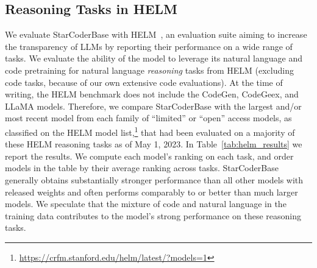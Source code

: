 \documentclass[10pt]{article} %
\begin{document}


\subsection{Reasoning Tasks in HELM}
% 


We evaluate StarCoderBase with HELM~\citep{liang2022helm}, an evaluation suite aiming to increase the transparency of LLMs by reporting their performance on a wide range of tasks. 
We evaluate the ability of the model to leverage its natural language and code pretraining for natural language \emph{reasoning} tasks from HELM (excluding code tasks, because of our own extensive code evaluations).
At the time of writing, the HELM benchmark does not include the CodeGen, CodeGeex, and LLaMA models. Therefore, we compare StarCoderBase with the largest and/or most recent model from each family of ``limited'' or ``open'' access models, as classified on the HELM model list,\footnote{\url{https://crfm.stanford.edu/helm/latest/?models=1}} that had been evaluated on a majority of these HELM reasoning tasks as of May 1, 2023.  In Table~\ref{tab:helm_results} we report the results. We compute each model's ranking on each task, and order models in the table by their average ranking across tasks. StarCoderBase generally obtains substantially stronger performance than all other models with released weights and often performs comparably to or better than much larger models. We speculate that the mixture of code and natural language in the training data contributes to the model's strong performance on these reasoning tasks.
\end{document}
